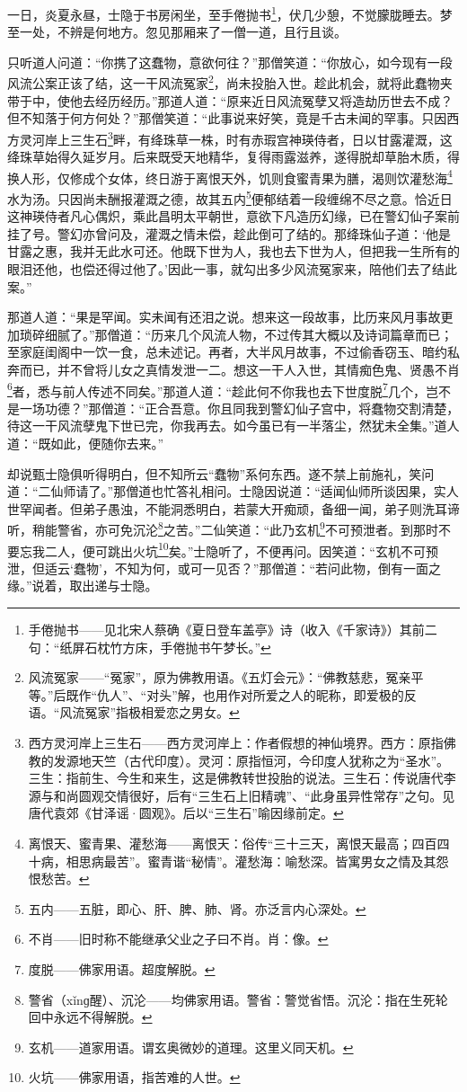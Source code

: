 \par 一日，炎夏永昼，士隐于书房闲坐，至手倦抛书\footnote{手倦抛书——见北宋人蔡确《夏日登车盖亭》诗（收入《千家诗》）其前二句：“纸屏石枕竹方床，手倦抛书午梦长。”}，伏几少憩，不觉朦胧睡去。梦至一处，不辨是何地方。忽见那厢来了一僧一道，且行且谈。
\par 只听道人问道：“你携了这蠢物，意欲何往？”那僧笑道：“你放心，如今现有一段风流公案正该了结，这一干风流冤家\footnote{风流冤家——“冤家”，原为佛教用语。《五灯会元》：“佛教慈悲，冤亲平等。”后既作“仇人”、“对头”解，也用作对所爱之人的昵称，即爱极的反语。“风流冤家”指极相爱恋之男女。}，尚未投胎入世。趁此机会，就将此蠢物夹带于中，使他去经历经历。”那道人道：“原来近日风流冤孽又将造劫历世去不成？但不知落于何方何处？”那僧笑道：“此事说来好笑，竟是千古未闻的罕事。只因西方灵河岸上三生石\footnote{西方灵河岸上三生石——西方灵河岸上：作者假想的神仙境界。西方：原指佛教的发源地天竺（古代印度）。灵河：原指恒河，今印度人犹称之为“圣水”。三生：指前生、今生和来生，这是佛教转世投胎的说法。三生石：传说唐代李源与和尚圆观交情很好，后有“三生石上旧精魂”、“此身虽异性常存”之句。见唐代袁郊《甘泽谣·圆观》。后以“三生石”喻因缘前定。}畔，有绛珠草一株，时有赤瑕宫神瑛侍者，日以甘露灌溉，这绛珠草始得久延岁月。后来既受天地精华，复得雨露滋养，遂得脱却草胎木质，得换人形，仅修成个女体，终日游于离恨天外，饥则食蜜青果为膳，渴则饮灌愁海\footnote{离恨天、蜜青果、灌愁海——离恨天：俗传“三十三天，离恨天最高；四百四十病，相思病最苦”。蜜青谐“秘情”。灌愁海：喻愁深。皆寓男女之情及其怨恨愁苦。}水为汤。只因尚未酬报灌溉之德，故其五内\footnote{五内——五脏，即心、肝、脾、肺、肾。亦泛言内心深处。}便郁结着一段缠绵不尽之意。恰近日这神瑛侍者凡心偶炽，乘此昌明太平朝世，意欲下凡造历幻缘，已在警幻仙子案前挂了号。警幻亦曾问及，灌溉之情未偿，趁此倒可了结的。那绛珠仙子道：‘他是甘露之惠，我并无此水可还。他既下世为人，我也去下世为人，但把我一生所有的眼泪还他，也偿还得过他了。’因此一事，就勾出多少风流冤家来，陪他们去了结此案。”
\par 那道人道：“果是罕闻。实未闻有还泪之说。想来这一段故事，比历来风月事故更加琐碎细腻了。”那僧道：“历来几个风流人物，不过传其大概以及诗词篇章而已；至家庭闺阁中一饮一食，总未述记。再者，大半风月故事，不过偷香窃玉、暗约私奔而已，并不曾将儿女之真情发泄一二。想这一干人入世，其情痴色鬼、贤愚不肖\footnote{不肖——旧时称不能继承父业之子曰不肖。肖：像。}者，悉与前人传述不同矣。”那道人道：“趁此何不你我也去下世度脱\footnote{度脱——佛家用语。超度解脱。}几个，岂不是一场功德？”那僧道：“正合吾意。你且同我到警幻仙子宫中，将蠢物交割清楚，待这一干风流孽鬼下世已完，你我再去。如今虽已有一半落尘，然犹未全集。”道人道：“既如此，便随你去来。”
\par 却说甄士隐俱听得明白，但不知所云“蠢物”系何东西。遂不禁上前施礼，笑问道：“二仙师请了。”那僧道也忙答礼相问。士隐因说道：“适闻仙师所谈因果，实人世罕闻者。但弟子愚浊，不能洞悉明白，若蒙大开痴顽，备细一闻，弟子则洗耳谛听，稍能警省，亦可免沉沦\footnote{警省（xǐnɡ醒）、沉沦——均佛家用语。警省：警觉省悟。沉沦：指在生死轮回中永远不得解脱。}之苦。”二仙笑道：“此乃玄机\footnote{玄机——道家用语。谓玄奥微妙的道理。这里义同天机。}不可预泄者。到那时不要忘我二人，便可跳出火坑\footnote{火坑——佛家用语，指苦难的人世。}矣。”士隐听了，不便再问。因笑道：“玄机不可预泄，但适云‘蠢物’，不知为何，或可一见否？”那僧道：“若问此物，倒有一面之缘。”说着，取出递与士隐。
